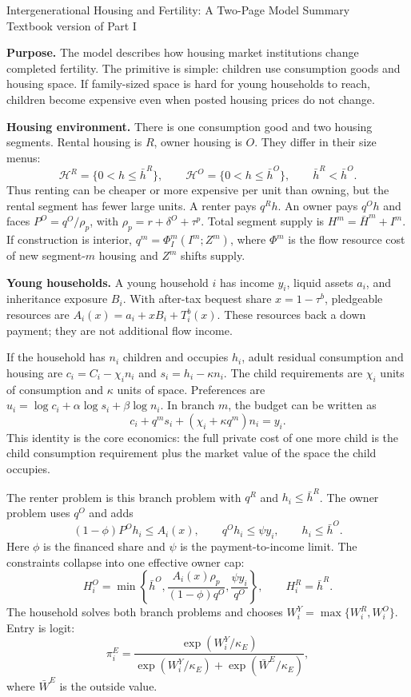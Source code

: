 \documentclass[10pt]{article}
\newcommand{\1}{\mathbf 1}
\newcommand{\HH}{\mathcal H}
\begin{document}
\normalsize

\begin{center}
{\large Intergenerational Housing and Fertility: A Two-Page Model Summary}\\[-0.2em]
{\normalsize Textbook version of Part I}
\end{center}

\textbf{Purpose.}
The model describes how housing market institutions change completed fertility. The primitive is simple: children use consumption goods and housing space. If family-sized space is hard for young households to reach, children become expensive even when posted housing prices do not change.

\textbf{Housing environment.}
There is one consumption good and two housing segments. Rental housing is \(R\), owner housing is \(O\). They differ in their size menus:
\[
\HH^R=\{0<h\le\bar h^R\},\qquad
\HH^O=\{0<h\le\bar h^O\},\qquad
\bar h^R<\bar h^O .
\]
Thus renting can be cheaper or more expensive per unit than owning, but the rental segment has fewer large units. A renter pays \(q^Rh\). An owner pays \(q^Oh\) and faces \(P^O=q^O/\rho_p\), with \(\rho_p=r+\delta^O+\tau^p\). Total segment supply is \(H^m=\bar H^m+I^m\). If construction is interior, \(q^m=\Phi_I^m(I^m;Z^m)\), where \(\Phi^m\) is the flow resource cost of new segment-\(m\) housing and \(Z^m\) shifts supply.

\textbf{Young households.}
A young household \(i\) has income \(y_i\), liquid assets \(a_i\), and inheritance exposure \(B_i\). With after-tax bequest share \(x=1-\tau^b\), pledgeable resources are \(A_i(x)=a_i+xB_i+T_i^b(x)\). These resources back a down payment; they are not additional flow income.

If the household has \(n_i\) children and occupies \(h_i\), adult residual consumption and housing are \(c_i=C_i-\chi_i n_i\) and \(s_i=h_i-\kappa n_i\). The child requirements are \(\chi_i\) units of consumption and \(\kappa\) units of space. Preferences are \(u_i=\log c_i+\alpha\log s_i+\beta\log n_i\). In branch \(m\), the budget can be written as
\[
c_i+q^m s_i+(\chi_i+\kappa q^m)n_i=y_i .
\]
This identity is the core economics: the full private cost of one more child is the child consumption requirement plus the market value of the space the child occupies.

The renter problem is this branch problem with \(q^R\) and \(h_i\le \bar h^R\). The owner problem uses \(q^O\) and adds
\[
(1-\phi)P^O h_i\le A_i(x),\qquad q^O h_i\le \psi y_i,\qquad h_i\le\bar h^O .
\]
Here \(\phi\) is the financed share and \(\psi\) is the payment-to-income limit. The constraints collapse into one effective owner cap:
\[
H_i^O=\min\left\{\bar h^O,\frac{A_i(x)\rho_p}{(1-\phi)q^O},\frac{\psi y_i}{q^O}\right\},
\qquad H_i^R=\bar h^R .
\]
The household solves both branch problems and chooses \(W_i^Y=\max\{W_i^R,W_i^O\}\). Entry is logit:
\[
\pi_i^E=\frac{\exp(W_i^Y/\kappa_E)}
{\exp(W_i^Y/\kappa_E)+\exp(\bar W^E/\kappa_E)} ,
\]
where \(\bar W^E\) is the outside value.
\end{document}
